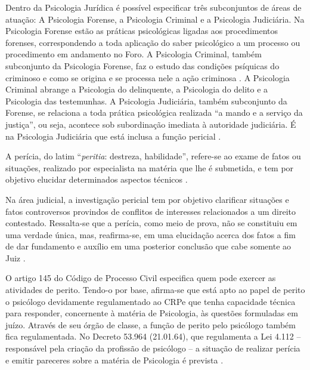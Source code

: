 Dentro da Psicologia Jurídica é possível especificar três subconjuntos de áreas de atuação: A Psicologia Forense, a Psicologia Criminal e a Psicologia Judiciária. Na Psicologia Forense estão as práticas psicológicas ligadas aos procedimentos forenses, correspondendo a toda aplicação do saber psicológico a um processo ou procedimento em andamento no Foro. A Psicologia Criminal, também subconjunto da Psicologia Forense, faz o estudo das condições psíquicas do criminoso e como se origina e se processa nele a ação criminosa . A Psicologia Criminal abrange a Psicologia do delinquente, a Psicologia do delito e a Psicologia das testemunhas. A Psicologia Judiciária, também subconjunto da Forense, se relaciona a toda prática psicológica realizada ``a mando e a serviço da justiça'', ou seja, acontece sob subordinação imediata à autoridade judiciária. É na Psicologia Judiciária que está inclusa a função pericial \cite{LEAL2008}.

A perícia, do latim ``\emph{peritia}: destreza, habilidade'', refere-se ao exame de fatos ou situações, realizado por especialista na matéria que lhe é submetida, e tem por objetivo elucidar determinados aspectos técnicos .

Na área judicial, a investigação pericial tem por objetivo clarificar situações e fatos controversos provindos de conflitos de interesses relacionados a um direito contestado. Ressalta-se que a perícia, como meio de prova, não se constituiu em uma verdade única, mas, reafirma-se, em uma elucidação acerca dos fatos a fim de dar fundamento e auxílio em uma posterior conclusão que cabe somente ao Juiz \cite{ROVINSKI2004}.

O artigo 145 do Código de Processo Civil especifica quem pode exercer as atividades de perito. Tendo-o por base, afirma-se que está apto ao papel de perito o psicólogo devidamente regulamentado ao CRP\footnotemark e que tenha capacidade técnica para responder, concernente à matéria de Psicologia, às questões formuladas em juízo. Através de seu órgão de classe, a função de perito pelo psicólogo também fica regulamentada. No Decreto 53.964 (21.01.64), que regulamenta a Lei 4.112 --  responsável pela criação da profissão de psicólogo -- a situação de realizar perícia e emitir pareceres sobre a matéria de Psicologia é prevista \cite{ROVINSKI2004}.


